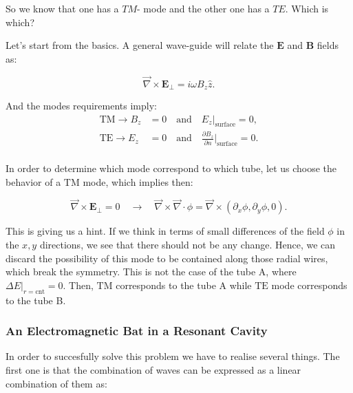 So we know that one has a $TM$- mode and the other one has a $TE$. Which is which?

Let's start from the basics. A general wave-guide will relate the $\mathbf{E}$ and $\mathbf{B}$ fields as:

\begin{equation}
	\vec{\nabla}\times\mathbf{E}_{\perp} = i \omega B_{z} \hat{z}.
\end{equation}

And the modes requirements imply:
\begin{equation}
	\begin{split}
		\mathrm{TM} \rightarrow B_{z} &= 0 \quad \text{and} \quad E_{z}|_{\mathrm{surface}} = 0,\\
		\mathrm{TE} \rightarrow E_{z} &= 0 \quad \text{and} \quad \tfrac{\partial B_{z}}{\partial n}|_{\mathrm{surface}} = 0.\\
	\end{split}
\end{equation}

In order to determine which mode correspond to which tube, let us choose the behavior of a $\mathrm{TM}$ mode, which implies then:

\begin{equation}
	\vec{\nabla} \times \mathbf{E}_{\perp} = 0 \quad \rightarrow \quad \vec{\nabla}\times \vec{\nabla}\cdot \phi = \vec{\nabla}\times (\partial_{x}\phi, \partial_{y} \phi, 0).
\end{equation}

This is giving us a hint. If we think in terms of small differences of the field $\phi$ in the $x,y$ directions, we see that there should not be any change. Hence, we can discard the possibility of this mode to be contained along those radial wires, which break the symmetry. This is not the case of the tube A, where $\Delta E|_{r=\mathrm{cnt}} = 0$. Then, $\mathrm{TM}$ corresponds to the tube A while $\mathrm{TE}$ mode corresponds to the tube B.

\subsubsection{An Electromagnetic Bat in a Resonant Cavity}\label{An Electromagnetic Bat in a Resonant Cavity}

In order to succesfully solve this problem we have to realise several things. The first one is that the combination of waves can be expressed as a linear combination of them as:

